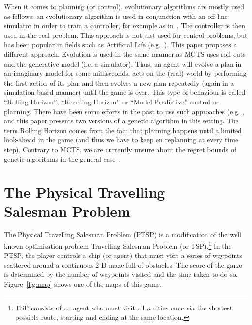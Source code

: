 \documentclass{sig-alternate}
\begin{document}
When it comes to planning (or control), evolutionary algorithms are mostly used as follows: an evolutionary algorithm is used in conjunction with an off-line simulator in order to train a controller, for example as in~\cite{gomez1999solving}. The controller is then used in the real problem. This approach is not just used for control problems, but has been popular in fields such as Artificial Life (e.g.~\cite{beer1992evolving}). This paper proposes a different approach. Evolution is used in the same manner as MCTS uses roll-outs and the generative model (i.e. a simulator). Thus, an agent will evolve a plan in an imaginary model for some milliseconds, acts on the (real) world by performing the first action of its plan and then evolves a new plan repeatedly (again in a simulation based manner) until the game is over. This type of behaviour is called ``Rolling Horizon'', ``Receding Horizon'' or ``Model Predictive'' control or planning.  There have been some efforts in the past to use such approaches (e.g. \cite{samothrakis2010planning,mercieca2011particle}, and this paper presents two versions of a genetic algorithm in this setting. The term Rolling Horizon comes from the fact that planning happens until a limited look-ahead in the game (and thus we have to keep on replanning at every time step). Contrary to MCTS, we are currently unsure about the regret bounds of genetic algorithms in the general case~\cite{reeves2002genetic}.

\section{The Physical Travelling \\Salesman Problem} \label{sec:ptsp}

The Physical Travelling Salesman Problem (PTSP) is a modification of the well known optimisation problem Travelling Salesman Problem (or TSP).\footnote{TSP consists of an agent who must visit all $n$ cities once via the shortest possible route, starting and ending at the same location.} In the PTSP, the player controls a ship (or agent) that must visit a series of waypoints scattered around a continuous 2-D maze full of obstacles. The score of the game is determined by the number of waypoints visited and the time taken to do so. Figure~\ref{fig:map} shows one of the maps of this game.
\end{document}
